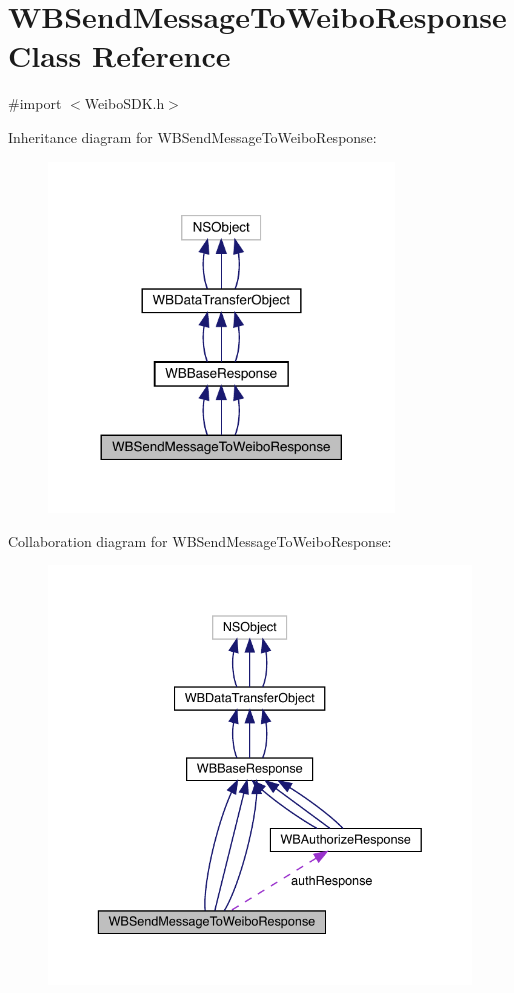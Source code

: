 \hypertarget{interface_w_b_send_message_to_weibo_response}{}\section{W\+B\+Send\+Message\+To\+Weibo\+Response Class Reference}
\label{interface_w_b_send_message_to_weibo_response}


{\ttfamily \#import $<$Weibo\+S\+D\+K.\+h$>$}



Inheritance diagram for W\+B\+Send\+Message\+To\+Weibo\+Response\+:\nopagebreak
\begin{figure}[H]
\begin{center}
\leavevmode
\includegraphics[width=260pt]{interface_w_b_send_message_to_weibo_response__inherit__graph}
\end{center}
\end{figure}


Collaboration diagram for W\+B\+Send\+Message\+To\+Weibo\+Response\+:\nopagebreak
\begin{figure}[H]
\begin{center}
\leavevmode
\includegraphics[width=336pt]{interface_w_b_send_message_to_weibo_response__coll__graph}
\end{center}
\end{figure}
